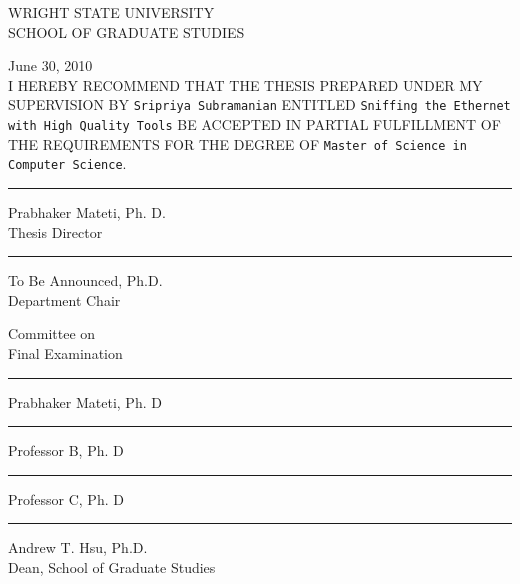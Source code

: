 \newpage
\thispagestyle{empty}

\begin{center}
WRIGHT STATE UNIVERSITY \\
SCHOOL OF GRADUATE STUDIES\\
\end{center}

\hfill
June 30, 2010\\			%

I HEREBY RECOMMEND THAT THE THESIS PREPARED UNDER MY SUPERVISION BY
{\tt Sripriya Subramanian}		%
ENTITLED
{\tt Sniffing the Ethernet with High Quality Tools} %
BE ACCEPTED IN PARTIAL FULFILLMENT OF THE
REQUIREMENTS FOR THE DEGREE OF
{\tt Master of Science in Computer Science}.\\


\hfill
\begin{minipage}{7cm}
\vskip 1cm\hrule\par\vskip 2mm
Prabhaker Mateti, Ph. D.\\	%
Thesis Director\\
\vskip 1cm\hrule\par\vskip 2mm
To Be Announced, Ph.D.\\
Department Chair\\
\end{minipage}

\vfill
\begin{minipage}{7cm}
Committee on\\
Final Examination\\
\vskip 1cm\hrule\par\vskip 2mm
Prabhaker Mateti, Ph. D\\	%
\vskip 1cm\hrule\par\vskip 2mm
Professor B, Ph. D\\		%
\vskip 1cm\hrule\par\vskip 2mm
Professor C, Ph. D\\		%
\vskip 1cm\hrule\par\vskip 2mm
Andrew T. Hsu, Ph.D.\\
Dean, School of Graduate Studies
\end{minipage}
